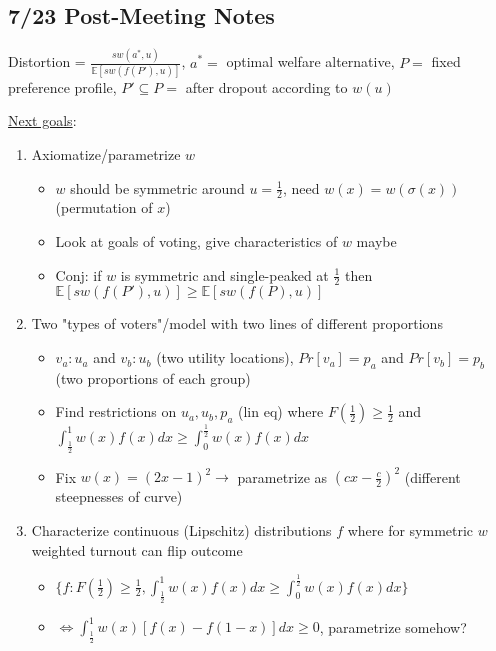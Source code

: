 \documentclass[12pt]{article}
\begin{document}
\subsection*{7/23 Post-Meeting Notes}

Distortion = $\frac{sw(a^*, u)}{\mathbb{E}[sw(f(P'), u)]}$, $a^* =$ optimal welfare alternative, $P =$ fixed preference profile, $P' \subseteq P =$ after dropout according to $w(u)$

\underline{Next goals}:
\begin{enumerate}[nolistsep]
    \item Axiomatize/parametrize $w$
    \begin{itemize}[nolistsep]
        \item $w$ should be symmetric around $u = \frac{1}{2}$, need $w(x) = w(\sigma(x))$ (permutation of $x$)
        \item Look at goals of voting, give characteristics of $w$ maybe
        \item Conj: if $w$ is symmetric and single-peaked at $\frac{1}{2}$ then $\mathbb{E}[sw(f(P'), u)] \geq \mathbb{E}[sw(f(P), u)]$
    \end{itemize}
    \item Two "types of voters"/model with two lines of different proportions
    \begin{itemize}[nolistsep]
        \item $v_a : u_a$ and $v_b : u_b$ (two utility locations), $Pr[v_a] = p_a$ and $Pr[v_b] = p_b$ (two proportions of each group)
        \item Find restrictions on $u_a, u_b, p_a$ (lin eq) where $F(\frac{1}{2}) \geq \frac{1}{2}$ and $\int_\frac{1}{2}^1w(x)f(x)dx \geq \int_0^\frac{1}{2}w(x)f(x)dx$
        \item Fix $w(x) = (2x-1)^2 \rightarrow$ parametrize as $(cx-\frac{c}{2})^2$ (different steepnesses of curve)
    \end{itemize}
    \item Characterize continuous (Lipschitz) distributions $f$ where for symmetric $w$ weighted turnout can flip outcome
    \begin{itemize}[nolistsep]
        \item $\{f: F(\frac{1}{2}) \geq \frac{1}{2}, \int_\frac{1}{2}^1w(x)f(x)dx \geq \int_0^\frac{1}{2}w(x)f(x)dx\}$
        \item $\iff \int_\frac{1}{2}^1w(x)[f(x)-f(1-x)]dx \geq 0$, parametrize somehow?
    \end{itemize}
\end{enumerate}
\end{document}
